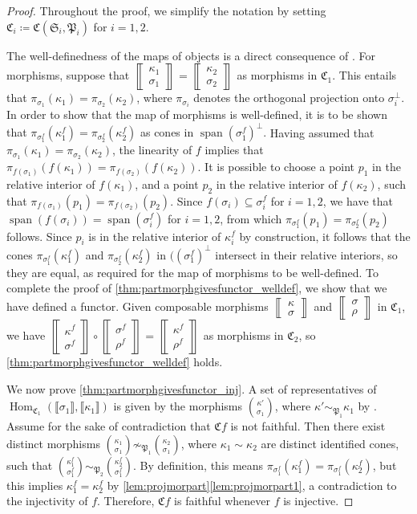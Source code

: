 \documentclass[10pt,twoside, a4paper,reqno]{amsart}
\DeclareMathOperator{\Hom}{Hom}
\DeclareMathOperator{\spann}{span}
\newcommand{\eqclass}[1]{ \llbracket #1 \rrbracket }
\newcommand{\catof}{\mathfrak{C}}
\newcommand{\sqbinom}[2]{\left\llbracket \!\begin{smallmatrix} #1 \\ #2 \end{smallmatrix}\!\right\rrbracket}
\newcommand{\Pfrak}{\mathfrak{P}}
\newcommand{\Sfan}{\mathfrak{S}}
\theoremstyle{definition}
\begin{document}
\begin{proof}
    Throughout the proof, we simplify the notation by setting $\catof_i\coloneqq \catof(\Sfan_i,\Pfrak_i)$ for $i=1,2$.

    The well-definedness of the maps of objects is a direct consequence of . For morphisms, suppose that $\sqbinom{{\kappa}_1}{\sigma_1}=\sqbinom{{\kappa}_2}{\sigma_2}$ as morphisms in $\catof_1$. This entails that $\pi_{\sigma_1}({\kappa}_1) = \pi_{\sigma_2}({\kappa}_2)$, where $\pi_{\sigma_i}$ denotes the orthogonal projection onto $\sigma_i^{\perp}$. {In order to show that the map of morphisms is well-defined, it is to be shown that $\pi_{\sigma_1^f}({\kappa}_1^f) = \pi_{\sigma_2^f}({\kappa}_2^f)$ as cones in $\spann(\sigma_1^f)^{\perp}$.} Having assumed that $\pi_{\sigma_1}({\kappa}_1) = \pi_{\sigma_2}({\kappa}_2)$, the linearity of $f$ implies that $\pi_{f(\sigma_1)}(f({\kappa}_1)) = \pi_{f(\sigma_2)}(f({\kappa}_2))$. It is possible to choose a point $p_1$ in the {relative} interior of $f({\kappa}_1)$, and a point $p_2$ in the {relative} interior of $f({\kappa}_2)$, such that $\pi_{f(\sigma_1)}(p_1) = \pi_{f(\sigma_2)}(p_2)$. Since $f(\sigma_i)\subseteq \sigma_i^f$ for $i=1,2$, we have that {$\spann(f(\sigma_i)) = \spann(\sigma_i^f)$ for $i=1,2$, from which} $\pi_{\sigma_1^f}(p_1) = \pi_{\sigma_2^f}(p_2)$ {follows}. Since $p_i$ is in the {relative}  interior of ${\kappa}_i^f$ by construction, it follows that the cones $\pi_{\sigma_1^f}({\kappa}_1^f)$ and $ \pi_{\sigma_2^f}({\kappa}_2^f)$ in 
    $((\sigma_1^f)^{\perp}$ intersect in their {relative} interior{s}, so they are equal, as required for the map of morphisms to be well-defined. To complete the proof of \eqref{thm:partmorphgivesfunctor_welldef}, we show that we have defined a functor. Given composable morphisms $\sqbinom{{\kappa}}{\sigma}$ and $ \sqbinom{\sigma}{\rho}$ in $\catof_1$, we have
    $
        \sqbinom{{\kappa}^f}{\sigma^f}\circ \sqbinom{\sigma^f}{\rho^f} = \sqbinom{{\kappa}^f}{\rho^f}
    $
    as morphisms in $\catof_2$, so \eqref{thm:partmorphgivesfunctor_welldef} holds.

    We now prove \eqref{thm:partmorphgivesfunctor_inj}. 
    {A set of representatives of $\Hom_{\catof_1}(\eqclass{\sigma_1}, \eqclass{{\kappa}_1})$ is given by the morphisms $\binom{{\kappa}'}{\sigma_1}$, where ${\kappa}' \sim_{\Pfrak_1} {\kappa}_1$ by \cite[Cor. 3.6]{Kai23}.  Assume for the sake of contradiction that $\catof f$ is not faithful. Then there exist distinct morphisms $\binom{{\kappa}_1}{\sigma_1} \not \sim_{\Pfrak_1} \binom{{\kappa}_2}{\sigma_1}$, where ${\kappa}_1 \sim {\kappa}_2$ are distinct identified cones, such that $\binom{{\kappa}_1^f}{\sigma_1^f} \sim_{\Pfrak_2} \binom{{\kappa}_2^f}{\sigma_1^f}$. By definition, this means {$\pi_{\sigma_1^f}(\kappa_1^f) = \pi_{\sigma_1^f}(\kappa_2^f)$, but this implies} ${\kappa}_1^f = {\kappa}_2^f$ by \cref{lem:projmorpart}\eqref{lem:projmorpart1}, a contradiction to the injectivity of $f$. Therefore, $\catof f$ is faithful whenever $f$ is injective.} 


\end{proof}
\end{document}

